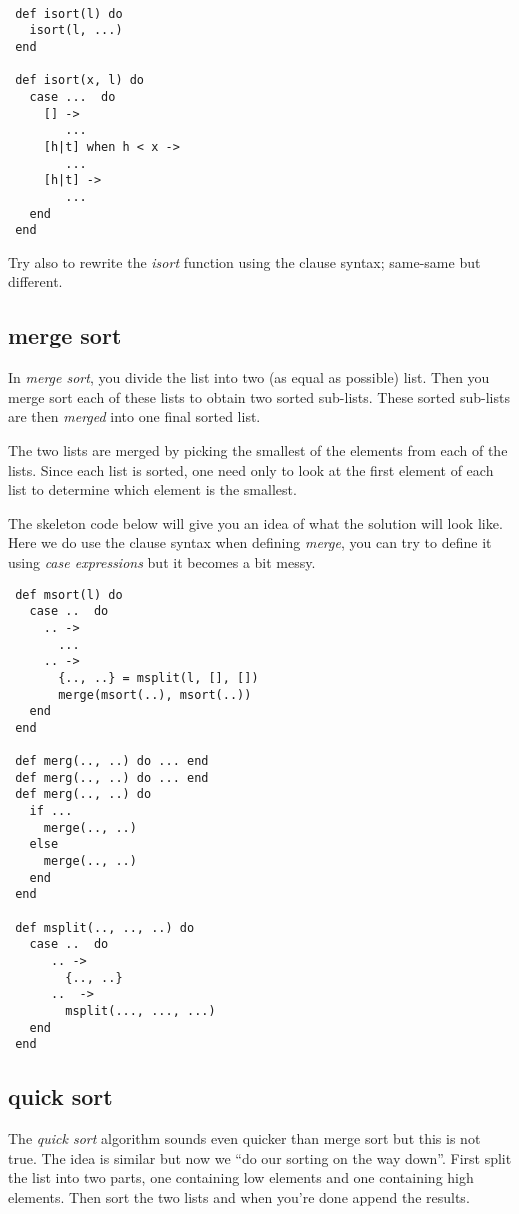 \documentclass[a4paper,11pt]{article}
\begin{document}
\begin{verbatim}

 def isort(l) do 
   isort(l, ...)
 end

 def isort(x, l) do
   case ...  do
     [] -> 
        ...
     [h|t] when h < x ->
        ...
     [h|t] ->
        ...
   end
 end
\end{verbatim}

Try also to rewrite the {\em isort} function using the clause syntax;
same-same but different.


\subsection{merge sort}

In {\em merge sort}, you divide the list into two (as equal as
possible) list. Then you merge sort each of these lists to obtain two
sorted sub-lists. These sorted sub-lists are then {\em merged} into
one final sorted list. 

The two lists are merged by picking the smallest of the elements from
each of the lists. Since each list is sorted, one need only to look at
the first element of each list to determine which element is the
smallest.

The skeleton code below will give you an idea of what the solution
will look like. Here we do use the clause syntax when defining {\em
  merge}, you can try to define it using {\em case expressions} but it
becomes a bit messy.

\begin{verbatim}
 def msort(l) do
   case ..  do
     .. -> 
       ...
     .. ->
       {.., ..} = msplit(l, [], [])
       merge(msort(..), msort(..))
   end
 end

 def merg(.., ..) do ... end
 def merg(.., ..) do ... end
 def merg(.., ..) do
   if ... 
     merge(.., ..)
   else 
     merge(.., ..)
   end
 end

 def msplit(.., .., ..) do
   case ..  do
      .. -> 
        {.., ..}
      ..  ->
        msplit(..., ..., ...)
   end
 end
\end{verbatim}

\subsection{quick sort}

The {\em quick sort} algorithm sounds even quicker than merge sort but
this is not true. The idea is similar but now we ``do our sorting on
the way down''. First split the list into two parts, one containing low
elements and one containing high elements. Then sort the two lists and
when you're done append the results. 
\end{document}

